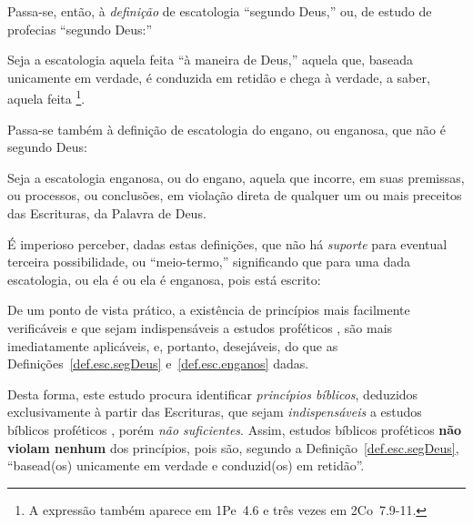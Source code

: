     Passa-se, então, à \emph{definição} de escatologia ``segundo Deus,'' ou, de estudo de profecias ``segundo Deus:''

    \begin{DEF}
        \label{def.esc.segDeus}
        Seja a escatologia  aquela feita ``à maneira de Deus,'' aquela que, baseada  unicamente
        em verdade, é conduzida em retidão e chega à verdade, a saber, aquela  feita  \footnote{A expressão    também
        aparece em 1Pe~4.6 e três vezes em 2Co~7.9-11.}.
    \end{DEF}

    Passa-se também à definição de escatologia do engano, ou enganosa, que não é segundo Deus:

    \begin{DEF}
        \label{def.esc.enganos}
        Seja a escatologia enganosa, ou do  engano,  aquela  que  incorre,  em  suas  premissas,  ou  processos,  ou
        conclusões, em violação direta de qualquer um ou mais preceitos das Escrituras, da Palavra de Deus.
    \end{DEF}

    É imperioso perceber,  dadas  estas  definições,  que  não  há  \emph{suporte}  para  eventual  terceira  possibilidade,  ou
    ``meio-termo,'' significando que para uma dada escatologia, ou ela é  ou  ela  é  enganosa,  pois  está
    escrito:


    De um ponto de vista prático, a existência de princípios mais facilmente verificáveis e que sejam indispensáveis  a  estudos
    proféticos  ,  são   mais   imediatamente   aplicáveis,   e,   portanto,   desejáveis,   do   que   as
    Definições~\ref{def.esc.segDeus} e~\ref{def.esc.enganos} dadas.

    Desta forma, este estudo procura identificar \emph{princípios bíblicos}, deduzidos exclusivamente à partir  das  Escrituras,
    que sejam \emph{indispensáveis} a estudos bíblicos proféticos , porém  \emph{não  suficientes}.  Assim,
    estudos bíblicos  proféticos    \textbf{não  violam  nenhum}  dos  princípios,  pois  são,  segundo  a
    Definição~\ref{def.esc.segDeus}, ``basead(os) unicamente em verdade e conduzid(os) em retidão''.

